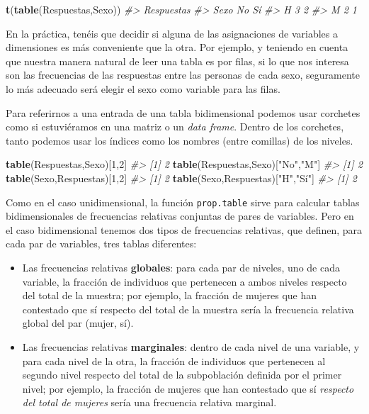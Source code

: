 \documentclass[
]{book}
\newenvironment{Shaded}{\begin{snugshade}}{\end{snugshade}}
\newcommand{\CommentTok}[1]{\textcolor[rgb]{0.56,0.35,0.01}{\textit{#1}}}
\newcommand{\DecValTok}[1]{\textcolor[rgb]{0.00,0.00,0.81}{#1}}
\newcommand{\KeywordTok}[1]{\textcolor[rgb]{0.13,0.29,0.53}{\textbf{#1}}}
\newcommand{\NormalTok}[1]{#1}
\newcommand{\StringTok}[1]{\textcolor[rgb]{0.31,0.60,0.02}{#1}}
\theoremstyle{definition}
\theoremstyle{definition}
\theoremstyle{definition}
\theoremstyle{remark}
\begin{document}
\begin{Shaded}
\begin{Highlighting}[]
\KeywordTok{t}\NormalTok{(}\KeywordTok{table}\NormalTok{(Respuestas,Sexo))}
\CommentTok{\#\textgreater{}     Respuestas}
\CommentTok{\#\textgreater{} Sexo No Sí}
\CommentTok{\#\textgreater{}    H  3  2}
\CommentTok{\#\textgreater{}    M  2  1}
\end{Highlighting}
\end{Shaded}

En la práctica, tenéis que decidir si alguna de las asignaciones de variables a dimensiones es más conveniente que la otra. Por ejemplo, y teniendo en cuenta que nuestra manera natural de leer una tabla es por filas, si lo que nos interesa son las frecuencias de las respuestas entre las personas de cada sexo, seguramente lo más adecuado será elegir el sexo como variable para las filas.

Para referirnos a una entrada de una tabla bidimensional podemos usar corchetes como si estuviéramos en una matriz o un \emph{data frame}. Dentro de los corchetes, tanto podemos usar los índices como los nombres (entre comillas) de los niveles.

\begin{Shaded}
\begin{Highlighting}[]
\KeywordTok{table}\NormalTok{(Respuestas,Sexo)[}\DecValTok{1}\NormalTok{,}\DecValTok{2}\NormalTok{]}
\CommentTok{\#\textgreater{} [1] 2}
\KeywordTok{table}\NormalTok{(Respuestas,Sexo)[}\StringTok{"No"}\NormalTok{,}\StringTok{"M"}\NormalTok{]}
\CommentTok{\#\textgreater{} [1] 2}
\KeywordTok{table}\NormalTok{(Sexo,Respuestas)[}\DecValTok{1}\NormalTok{,}\DecValTok{2}\NormalTok{]}
\CommentTok{\#\textgreater{} [1] 2}
\KeywordTok{table}\NormalTok{(Sexo,Respuestas)[}\StringTok{"H"}\NormalTok{,}\StringTok{"Sí"}\NormalTok{]}
\CommentTok{\#\textgreater{} [1] 2}
\end{Highlighting}
\end{Shaded}

Como en el caso unidimensional, la función \texttt{prop.table} sirve para calcular tablas bidimensionales de frecuencias relativas conjuntas de pares de variables. Pero en el caso bidimensional tenemos dos tipos de frecuencias relativas, que definen, para cada par de variables, tres tablas diferentes:

\begin{itemize}
\item
  Las frecuencias relativas \textbf{globales}: para cada par de niveles, uno de cada variable, la fracción de individuos que pertenecen a ambos niveles respecto del total de la muestra; por ejemplo, la fracción de mujeres que han contestado que sí respecto del total de la muestra sería la frecuencia relativa global del par (mujer, sí).
\item
  Las frecuencias relativas \textbf{marginales}: dentro de cada nivel de una variable, y para cada nivel de la otra,
  la fracción de individuos que pertenecen al segundo nivel respecto del total de la subpoblación definida por el primer nivel; por ejemplo, la fracción de mujeres que han contestado que sí \emph{respecto del total de mujeres} sería una frecuencia relativa marginal.
\end{itemize}
\end{document}

